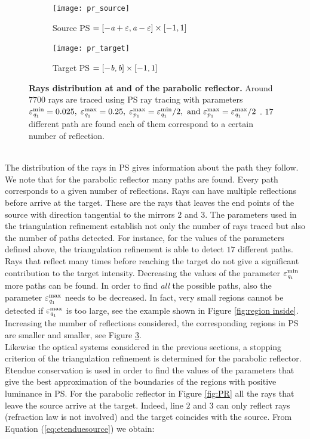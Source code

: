 \begin{figure}[h]
 \begin{subfigure}[t]{0.47\textwidth}
\centering
    \texttt{[image: pr\_source]}
    \caption{Source PS  $= [-\textit{a}+\varepsilon,\textit{a}-\varepsilon]\times[-1,1]$}
    \label{fig:source_triang_pr}
\end{subfigure}
\hfill
\begin{subfigure}[t]{0.47\textwidth}
\centering
    \texttt{[image: pr\_target]}
    \caption{Target PS  $= [-\textit{b},\textit{b}]\times[-1,1]$}
    \label{fig:target_triang_pr}
\end{subfigure}
\caption{\textbf{Rays distribution at  and  of the parabolic reflector.} Around $7700$ rays are traced using PS ray tracing with parameters $\varepsilon_{\textit{q}_1}^{\textrm{min}} = 0.025, \; \varepsilon_{\textit{q}_1}^{\textrm{max}} = 0.25, \; \varepsilon_{\textit{p}_1}^{\textrm{max}} = \varepsilon_{\textit{q}_1}^{\textrm{min}}/2, \mbox{ and }  \varepsilon_{\textit{p}_1}^{\textrm{max}} = \varepsilon_{\textit{q}_1}^{\textrm{max}}/2$ . $17$ different path are found each of them correspond to a certain number of reflection.}
 \label{fig:phase_space_pr}
\end{figure}\\ 
The distribution of the rays in PS gives information about the path they follow. We note that for the parabolic reflector many paths are found. Every path corresponds to a given number of reflections. Rays can have multiple reflections before arrive at the target. These are the rays that leaves the end points of the source with direction tangential to the mirrors $2$ and $3$. The parameters used in the triangulation refinement establish not only the number of rays traced but also the number of paths detected. For instance, for the values of the parameters defined above, the triangulation refinement is able to detect $17$ different paths.  Rays that reflect many times before reaching the target do not give a significant contribution to the target intensity. Decreasing the values of the parameter $\varepsilon_{\textit{q}_1}^{\textrm{min}}$ more paths can be found. In order to find \textit{all} the possible paths, also the parameter $\varepsilon_{\textit{q}_1}^{\textrm{max}}$ needs to be decreased. In fact, very small regions cannot be detected if $\varepsilon_{\textit{q}_1}^{\textrm{max}}$ is too large, see the example shown in Figure \ref{fig:region inside}. Increasing the number of reflections considered, the corresponding regions in PS are smaller and smaller, see Figure \ref{fig:phase_space_pr}. \\ \indent Likewise the optical systems considered in the previous sections, a stopping criterion of the triangulation refinement is determined for the parabolic reflector. Etendue conservation is used in order to find the values of the parameters that give the best approximation of the boundaries of the regions with positive luminance in PS. For the parabolic reflector in Figure \ref{fig:PR} all the rays that leave the source arrive at the target. Indeed, line $2$ and $3$ can only reflect rays (refraction law is not involved) and the target coincides with the source. From Equation (\ref{eq:etenduesource}) we obtain:
